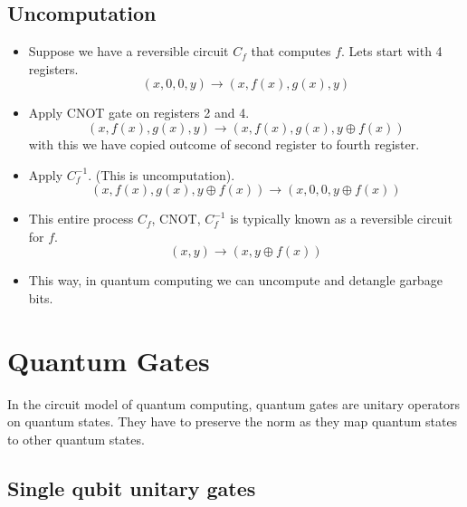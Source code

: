 \documentclass[11.5pt, paper=a4]{article}
\theoremstyle{definition}
\numberwithin{theorem}{section}
\begin{document}
\subsection{Uncomputation}
\begin{itemize}
    \item Suppose we have a reversible circuit $C_f$ that computes $f$. Lets start with 4 registers.
    \[ (x, 0, 0, y) \longrightarrow (x, f(x), g(x), y) \]
    \item Apply CNOT gate on registers 2 and 4.
    \[ (x, f(x), g(x), y) \longrightarrow (x, f(x), g(x), y \oplus f(x)) \]
    with this we have copied outcome of second register to fourth register.
    \item Apply $C_f^{-1}$. (This is uncomputation).
    \[ (x, f(x), g(x),  y \oplus f(x)) \longrightarrow (x, 0, 0, y \oplus f(x)) \]
    \item This entire process $C_f$, CNOT, $C_f^{-1}$ is typically known as a reversible circuit for $f$.
    \[ (x, y) \longrightarrow (x, y \oplus f(x)) \]
    \item This way, in quantum computing we can uncompute and detangle garbage bits.
\end{itemize}

\newpage
\section{Quantum Gates}
In the circuit model of quantum computing, quantum gates are unitary operators on quantum states. They have to preserve the norm as they map quantum states to other quantum states.
\subsection{Single qubit unitary gates}
\end{document}
